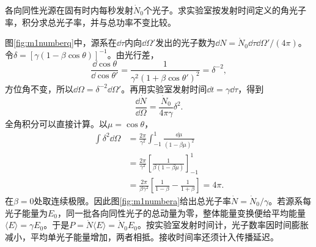 \begin{exercise}\label{ex:m1numberangular}
各向同性光源在固有时内每秒发射$\dot N_0$个光子。求实验室按发射时间定义的角光子率，积分求总光子率，并与总功率不变比较。
\end{exercise}
\begin{solution}
图\ref{fig:m1numberq}中，源系在$\dd\tau$内向$\dd\Omega'$发出的光子数为$\dd N=\dot N_0\dd\tau\dd\Omega'/(4\pi)$。令$\delta=[\gamma(1-\beta\cos\theta)]^{-1}$。由光行差，
\[
 \frac{\dd\cos\theta}{\dd\cos\theta'}
 =\frac1{\gamma^2(1+\beta\cos\theta')^2}=\delta^{-2},
\]
方位角不变，所以$\dd\Omega=\delta^{-2}\dd\Omega'$。再用实验室发射时间$\dd t=\gamma\dd\tau$，得到
\[
 \frac{\dd\dot N}{\dd\Omega}=\frac{\dot N_0}{4\pi\gamma}\delta^2.
\]
全角积分可以直接计算。以$\mu=\cos\theta$，
\begin{align*}
 \int\delta^2\dd\Omega
 &=\frac{2\pi}{\gamma^2}\int_{-1}^1\frac{\dd\mu}{(1-\beta\mu)^2}\\
 &=\frac{2\pi}{\gamma^2}
 \left[\frac{1}{\beta(1-\beta\mu)}\right]_{-1}^1\\
 &=\frac{2\pi}{\beta\gamma^2}
 \left[\frac1{1-\beta}-\frac1{1+\beta}\right]=4\pi.
\end{align*}
在$\beta=0$处取连续极限。因此图\ref{fig:m1numbera}给出总光子率$\dot N=\dot N_0/\gamma$。若源系每光子能量为$E_0$，同一批各向同性光子的总动量为零，整体能量变换便给平均能量$\langle E\rangle=\gamma E_0$。于是$P=\dot N\langle E\rangle=\dot N_0E_0$。按实验室发射时间计，光子数率因时间膨胀减小，平均单光子能量增加，两者相抵。接收时间率还须计入传播延迟。
\end{solution}

